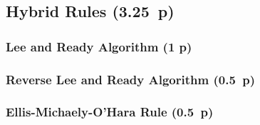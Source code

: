 \begin{algorithm}

  \caption{$\operatorname{\mathtt{tradesize}}$ \label{alg:tradesize-rule}}


  \BlankLine %

\end{algorithm}


\subsection{Hybrid Rules (3.25~p)}\label{hybrid-rules}

\subsubsection{Lee and Ready Algorithm (1 p)}\label{lee-and-ready-algorithm}

\subsubsection{Reverse Lee and Ready
  Algorithm (0.5~p)}\label{reverse-lee-and-ready-algorithm}

\subsubsection{Ellis-Michaely-O'Hara
  Rule (0.5~p)}\label{ellis-michaely-ohara-rule}

